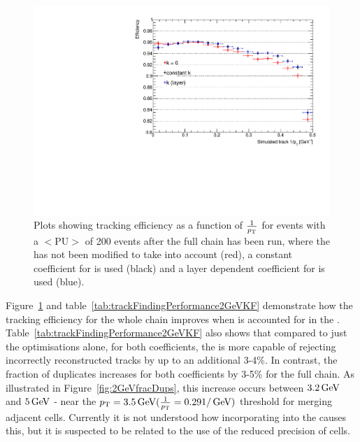 \begin{figure}[tbp]
\centering
\includegraphics[width=\textwidth]{figs/tk-upgrade/results-lowPtTracking/kfTrackingEffVsInvPtTiltedGeometry_5000.pdf}
\caption{Plots showing tracking efficiency as a function of $\frac{1}{p_{\mathrm{T}}}$ for \ttbar events with a $<\textrm{PU}>$ of 200 events after the full chain has been run, where the \KF has not been modified to take \MS into account (red), a constant coefficient for \MS is used (black) and a layer dependent coefficient for \MS is used (blue).
}
\label{fig:2GeVTiltEff}	
\end{figure}

Figure~\ref{fig:2GeVTiltEff} and table~\ref{tab:trackFindingPerformance2GeVKF} demonstrate how the tracking efficiency for the whole chain improves when \MS is accounted for in the \KF.
Table~\ref{tab:trackFindingPerformance2GeVKF} also shows that compared to just the \HT optimisations alone, for both \MS coefficients, the \KF is more capable of rejecting incorrectly reconstructed tracks by up to an additional 3-4\%.
In contrast, the fraction of duplicates increases for both coefficients by 3-5\% for the full chain.
As illustrated in Figure~\ref{fig:2GeVfracDups}, this increase occurs between $3.2\,\text{Ge\hspace{-.08em}V}$ and $5\,\text{Ge\hspace{-.08em}V}$ - near the $p_{\mathrm{T}} = 3.5\,\text{Ge\hspace{-.08em}V} (\frac{1}{p_{\mathrm{T}}} = 0.29 1/\,\text{Ge\hspace{-.08em}V})$ threshold for merging adjacent \HT cells.
Currently it is not understood how incorporating \MS into the \KF causes this, but it is suspected to be related to the use of the reduced precision of \HT cells.

